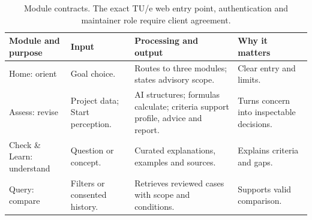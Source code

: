 \begin{table}[H]
\centering\small
\begin{tabularx}{\textwidth}{@{}>{\raggedright\arraybackslash}p{}>{\raggedright\arraybackslash}p{}>{\raggedright\arraybackslash}p{}>{\raggedright\arraybackslash}X@{}}
\toprule
Module and purpose & Input & Processing and output & Why it matters \\
\midrule
Home: orient & Goal choice. & Routes to three modules; states advisory scope. & Clear entry and limits. \\
Assess: revise & Project data; Start perception. & AI structures; formulas calculate; criteria support profile, advice and report. & Turns concern into inspectable decisions. \\
Check \& Learn: understand & Question or concept. & Curated explanations, examples and sources. & Explains criteria and gaps. \\
Query: compare & Filters or consented history. & Retrieves reviewed cases with scope and conditions. & Supports valid comparison. \\
\bottomrule
\end{tabularx}
\caption{Module contracts. The exact TU/e web entry point, authentication and maintainer role require client agreement.}
\label{tab:phase2-modules}
\end{table}

